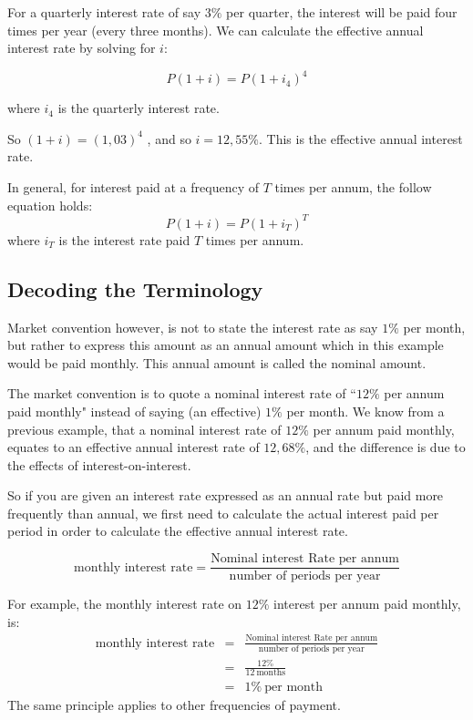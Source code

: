 For a quarterly interest rate of say $3\%$ per quarter, the interest will be paid four times per year (every three months). We can calculate the effective annual interest rate by solving for $i$:

\begin{equation*}
P(1 + i ) = P(1 + i_4 )^4
\end{equation*}

where $i_4$ is the quarterly interest rate.

So
$(1 + i ) = (1,03 )^4$ , and so $i = 12,55\%$. This is the effective annual interest rate.

In general, for interest paid at a frequency of $T$ times per annum, the follow equation holds:
\begin{equation}
P(1 + i) = P(1 + i_T)^{T}
\end{equation}
where $i_T$ is the interest rate paid $T$ times per annum.

\subsection{Decoding the Terminology}
Market convention however, is not to state the interest rate as say $1\%$ per month, but rather to express this amount as an annual amount which in this example would be paid monthly. This annual amount is called the nominal amount.

The market convention is to quote a nominal interest rate of ``$12\%$ per annum paid monthly" instead of saying (an effective) $1\%$ per month. We know from a previous example, that a nominal interest rate of $12\%$ per annum paid monthly, equates to an effective annual interest rate of $12,68\%$, and the difference is due to the effects of interest-on-interest.

So if you are given an interest rate expressed as an annual rate but paid more frequently than annual, we first need to calculate the actual interest paid per period in order to calculate the effective annual interest rate.

\begin{equation}
\mbox{monthly interest rate}=\frac{\mbox{Nominal interest Rate per annum}}{\mbox{number of periods per year}}
\end{equation}

For example, the monthly interest rate on $12\%$ interest per annum paid monthly, is:
\begin{eqnarray*}
\mbox{monthly interest rate}&=&\frac{\mbox{Nominal interest Rate per annum}}{\mbox{number of periods per year}}\\
&=& \frac{12\%}{12~\mbox{months}}\\
&=& 1\%~\mbox{per month}
\end{eqnarray*}
The same principle applies to other frequencies of payment.

